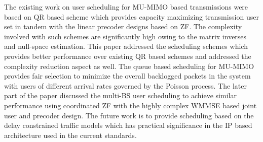 The existing work on user scheduling for MU-MIMO based transmissions were based on QR based scheme which provides capacity maximizing transmission user set in tandem with the linear precoder designs based on ZF. The complexity involved with such schemes are significantly high owing to the matrix inverses and null-space estimation. This paper addressed the scheduling schemes which provides better performance over existing QR based schemes and addressed the complexity reduction aspect as well. The queue based scheduling for MU-MIMO provides fair selection to minimize the overall backlogged packets in the system with users of different arrival rates governed by the Poisson process. The later part of the paper discussed the multi-BS user scheduling to achieve similar performance using coordinated ZF with the highly complex WMMSE based joint user and precoder design. The future work is to provide scheduling based on the delay constrained traffic models which has practical significance in the IP based architecture used in the current standards. 